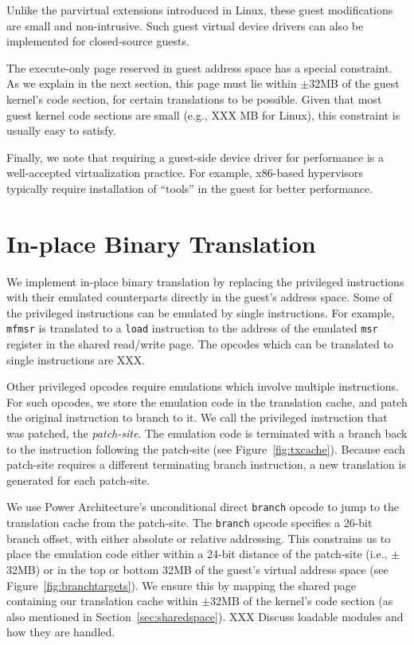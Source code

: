 \documentclass[10pt,twocolumn]{article}
\begin{document}
Unlike the parvirtual extensions introduced in Linux, these guest
modifications are small and non-intrusive. Such guest virtual device drivers
can also be implemented for closed-source guests.

The execute-only page reserved in guest address space has a special
constraint. As we explain in the
next section, this page must lie within $\pm$32MB of the
guest kernel's code section, for certain translations to be possible.
Given that most guest kernel code sections are
small (e.g., XXX MB for Linux), this constraint is usually easy to satisfy.

Finally, we note that requiring a guest-side device driver for performance
is a well-accepted virtualization practice. For example, x86-based hypervisors
typically require installation of ``tools'' in the guest for better performance.

\section{In-place Binary Translation}
\label{sec:bintrans}
We implement in-place binary translation by replacing the
privileged instructions
with their emulated counterparts directly
in the guest's address space. Some of the privileged instructions can
be emulated by single instructions. For example, {\tt mfmsr} is translated
to a {\tt load} instruction to the address of the emulated {\tt msr}
register in the shared read/write page. The opcodes which can be
translated to single instructions are XXX.

Other privileged opcodes require emulations which involve multiple instructions.
For such opcodes, we store the emulation code in the translation cache, and
patch the original instruction to branch to it. We call the privileged instruction
that was patched, the {\em patch-site}. The emulation code is terminated
with a branch back to the instruction following the patch-site
(see Figure~\ref{fig:txcache}). Because each patch-site requires a different
terminating branch instruction, a new translation is generated for
each patch-site.

We use Power Architecture's unconditional direct {\tt branch} opcode to jump to the
translation cache from the patch-site. The {\tt branch} opcode specifies a 26-bit
branch offset, with either absolute or relative addressing. This constrains us
to place the emulation code either within a 24-bit distance of the patch-site (i.e.,
$\pm$32MB) or in the top or bottom 32MB of the guest's virtual address
space (see Figure~\ref{fig:branchtargets}). We ensure this by mapping the shared
page containing our translation cache within $\pm$32MB of the kernel's code
section (as also mentioned in Section~\ref{sec:sharedspace}). XXX Discuss loadable
modules and how they are handled.
\end{document}
